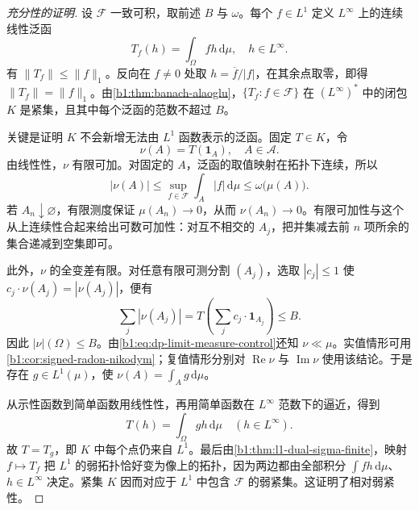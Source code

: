 \begin{proof}[充分性的证明]
设 \(\mathcal F\) 一致可积，取前述 \(B\) 与 \(\omega\)。每个 \(f\in L^1\) 定义 \(L^\infty\) 上的连续线性泛函
\[
  T_f(h)=\int_\Omega fh\,\mathrm d\mu,
  \quad h\in L^\infty.
\]
有 \(\|T_f\|\leq\|f\|_1\)。反向在 \(f\ne0\) 处取 \(h=\overline f/|f|\)，在其余点取零，即得 \(\|T_f\|=\|f\|_1\)。由\cref{b1:thm:banach-alaoglu}，\(\{T_f:f\in\mathcal F\}\) 在 \((L^\infty)^*\) 中的\WeakStar{}闭包 \(K\) 是紧集，且其中每个泛函的范数不超过 \(B\)。

关键是证明 \(K\) 不会新增无法由 \(L^1\) 函数表示的泛函。固定 \(T\in K\)，令
\[
  \nu(A)=T(\mathbf1_A),\quad A\in\mathcal A.
\]
由线性性，\(\nu\) 有限可加。对固定的 \(A\)，泛函的取值映射在\WeakStar{}拓扑下连续，所以
\begin{equation}
\label{b1:eq:dp-limit-measure-control}
  |\nu(A)|\leq\sup_{f\in\mathcal F}
                  \int_A|f|\,\mathrm d\mu
              \leq\omega\bigl(\mu(A)\bigr).
\end{equation}
若 \(A_n\downarrow\varnothing\)，有限测度保证 \(\mu(A_n)\to0\)，从而 \(\nu(A_n)\to0\)。有限可加性与这个从上连续性合起来给出可数可加性：对互不相交的 \(A_j\)，把并集减去前 \(n\) 项所余的集合递减到空集即可。

此外，\(\nu\) 的全变差有限。对任意有限可测分割 \((A_j)\)，选取 \(|c_j|\leq1\) 使 \(c_j\cdot\nu(A_j)=|\nu(A_j)|\)，便有
\[
  \sum_j|\nu(A_j)|
  =T\left(\sum_jc_j\cdot\mathbf1_{A_j}\right)\leq B.
\]
因此 \(|\nu|(\Omega)\leq B\)。由\eqref{b1:eq:dp-limit-measure-control}还知 \(\nu\ll\mu\)。实值情形可用\cref{b1:cor:signed-radon-nikodym}；复值情形分别对 \(\operatorname{Re}\nu\) 与 \(\operatorname{Im}\nu\) 使用该结论。于是存在 \(g\in L^1(\mu)\)，使 \(\nu(A)=\int_Ag\,\mathrm d\mu\)。

从示性函数到简单函数用线性性，再用简单函数在 \(L^\infty\) 范数下的逼近，得到
\[
  T(h)=\int_\Omega gh\,\mathrm d\mu\quad(h\in L^\infty).
\]
故 \(T=T_g\)，即 \(K\) 中每个点仍来自 \(L^1\)。最后由\cref{b1:thm:l1-dual-sigma-finite}，映射 \(f\mapsto T_f\) 把 \(L^1\) 的弱拓扑恰好变为像上的\WeakStar{}拓扑，因为两边都由全部积分 \(\int fh\,\mathrm d\mu\)、\(h\in L^\infty\) 决定。紧集 \(K\) 因而对应于 \(L^1\) 中包含 \(\mathcal F\) 的弱紧集。这证明了相对弱紧性。
\end{proof}

